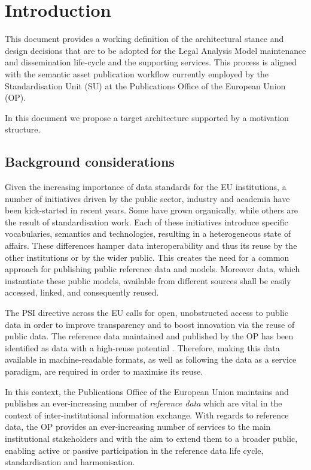 \chapter{Introduction}
\label{sec:introduction}
	
	This document provides a working definition of the architectural stance and design decisions that are to be adopted for the Legal Analysis Model maintenance and dissemination life-cycle and the supporting services. This process is aligned with the semantic asset publication workflow currently employed by the Standardisation Unit (SU) at the Publications Office of the European Union (OP).
	
	In this document we propose a target architecture supported by a motivation structure.
	
	\section{Background considerations}
	
	Given the increasing importance of data standards for the EU institutions, a number of initiatives driven by the public sector, industry and academia have been kick-started in recent years. Some have grown organically, while others are the result of standardisation work. Each of these initiatives introduce specific vocabularies, semantics and technologies, resulting in a heterogeneous state of affairs. These differences hamper data interoperability and thus its reuse by the other institutions or by the wider public. This creates the need for a common approach for publishing public reference data and models. Moreover data, which instantiate these public models, available from different sources shall be easily accessed, linked, and consequently reused.
	
	The PSI directive \cite{directive-2019/1024} across the EU calls for open, unobstructed access to public data in order to improve transparency and to boost innovation via the reuse of public data. The reference data maintained and published by the OP has been identified as data with a high-reuse potential \cite{d-high-value-assets}. Therefore, making this data available in machine-readable formats, as well as following the data as a service paradigm, are required in order to maximise its reuse.
	
	In this context, the Publications Office of the European Union maintains and publishes an ever-increasing number of \textit{reference data} which are vital in the context of inter-institutional information exchange. With regards to reference data, the OP provides an ever-increasing number of services to the main institutional stakeholders and with the aim to extend them to a broader public, enabling active or passive participation in the reference data life cycle, standardisation and harmonisation.

